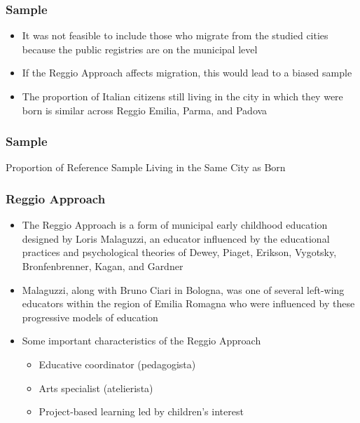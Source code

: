 \documentclass[static]{JJH-Beamer_PAGENOS}
\begin{document}
\begin{frame}
\frametitle{Sample}
\begin{itemize}
	\item It was not feasible to include those who migrate from the studied cities because the public registries are on the municipal level
	\item If the Reggio Approach affects migration, this would lead to a biased sample
	\item The proportion of Italian citizens still living in the city in which they were born is similar across Reggio Emilia, Parma, and Padova
\end{itemize}
\end{frame}

\begin{frame}
\frametitle{Sample}
\begin{table}[H]
\caption{Proportion of Reference Sample Living in the Same City as Born}
\end{table}
\end{frame}


\begin{frame}
\frametitle{Reggio Approach}
\begin{itemize}
	\item The Reggio Approach is a form of municipal early childhood education designed by Loris Malaguzzi, an educator influenced by the educational practices and psychological theories of Dewey, Piaget, Erikson, Vygotsky, Bronfenbrenner, Kagan, and Gardner
	\item Malaguzzi, along with Bruno Ciari in Bologna, was one of several left-wing educators within the region of Emilia Romagna who were influenced by these progressive models of education \citep{Cagliari-etal-eds_2016_BOOK_Loris-Malaguzzi}
	\item Some important characteristics of the Reggio Approach
	\begin{itemize}
		\item Educative coordinator (pedagogista)
		\item Arts specialist (atelierista)
		\item Project-based learning led by children's interest 
	\end{itemize}
\end{itemize}
\end{frame}
\end{document}
